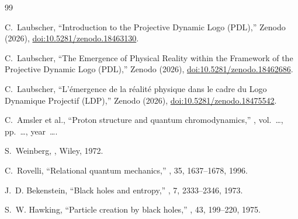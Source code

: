 \documentclass[11pt,a4paper]{article}
\begin{document}
\newpage

\begin{thebibliography}{99}

C.~Laubscher,
\newblock ``Introduction to the Projective Dynamic Logo (PDL),''
\newblock Zenodo (2026), \href{https://doi.org/10.5281/zenodo.18463130}{doi:10.5281/zenodo.18463130}.

C.~Laubscher,
\newblock ``The Emergence of Physical Reality within the Framework of the Projective Dynamic Logo (PDL),''
\newblock Zenodo (2026), \href{https://doi.org/10.5281/zenodo.18462686}{doi:10.5281/zenodo.18462686}.

C.~Laubscher,
\newblock ``L'\'emergence de la r\'ealit\'e physique dans le cadre du Logo Dynamique Projectif (LDP),''
\newblock Zenodo (2026), \href{https://doi.org/10.5281/zenodo.18475542}{doi:10.5281/zenodo.18475542}.


C.~Amsler et al.,
\newblock ``Proton structure and quantum chromodynamics,''
, vol.~\dots, pp.~\dots, year~\dots.

S.~Weinberg,
,
\newblock Wiley, 1972.

C.~Rovelli,
\newblock ``Relational quantum mechanics,''
, 35, 1637--1678, 1996.

J.~D. Bekenstein,
\newblock ``Black holes and entropy,''
, 7, 2333--2346, 1973.

S.~W. Hawking,
\newblock ``Particle creation by black holes,''
, 43, 199--220, 1975.


\end{thebibliography}
\end{document}
